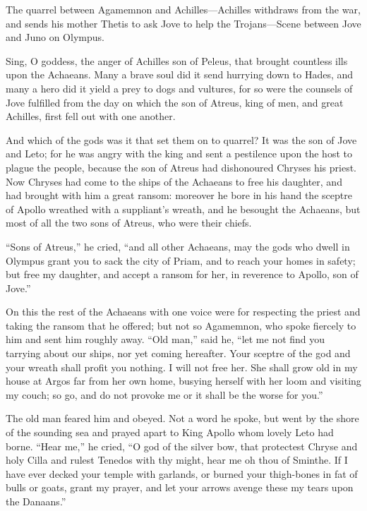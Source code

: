 
The quarrel between Agamemnon and Achilles—Achilles withdraws from
the war, and sends his mother Thetis to ask Jove to help the Trojans—Scene
between Jove and Juno on Olympus.

Sing, O goddess, the anger of Achilles son of Peleus, that brought
countless ills upon the Achaeans. Many a brave soul did it send hurrying
down to Hades, and many a hero did it yield a prey to dogs and vultures,
for so were the counsels of Jove fulfilled from the day on which the son
of Atreus, king of men, and great Achilles, first fell out with one
another.

And which of the gods was it that set them on to quarrel? It was the son
of Jove and Leto; for he was angry with the king and sent a pestilence
upon the host to plague the people, because the son of Atreus had
dishonoured Chryses his priest. Now Chryses had come to the ships of the
Achaeans to free his daughter, and had brought with him a great ransom:
moreover he bore in his hand the sceptre of Apollo wreathed with a
suppliant’s wreath, and he besought the Achaeans, but most of all the two
sons of Atreus, who were their chiefs.

“Sons of Atreus,” he cried, “and all other Achaeans, may the gods who
dwell in Olympus grant you to sack the city of Priam, and to reach your
homes in safety; but free my daughter, and accept a ransom for her, in
reverence to Apollo, son of Jove.”

On this the rest of the Achaeans with one voice were for respecting the
priest and taking the ransom that he offered; but not so Agamemnon, who
spoke fiercely to him and sent him roughly away. “Old man,” said he, “let
me not find you tarrying about our ships, nor yet coming hereafter. Your
sceptre of the god and your wreath shall profit you nothing. I will not
free her. She shall grow old in my house at Argos far from her own home,
busying herself with her loom and visiting my couch; so go, and do not
provoke me or it shall be the worse for you.”

The old man feared him and obeyed. Not a word he spoke, but went by the
shore of the sounding sea and prayed apart to King Apollo whom lovely Leto
had borne. “Hear me,” he cried, “O god of the silver bow, that protectest
Chryse and holy Cilla and rulest Tenedos with thy might, hear me oh thou
of Sminthe. If I have ever decked your temple with garlands, or burned
your thigh-bones in fat of bulls or goats, grant my prayer, and let your
arrows avenge these my tears upon the Danaans.”


